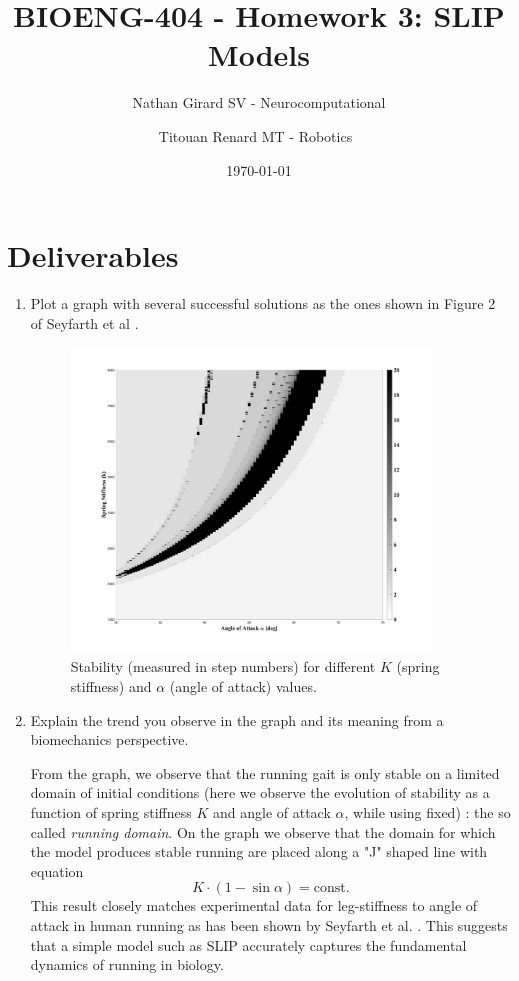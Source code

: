 \documentclass[11pt]{article}
\title{BIOENG-404 - Homework 3: SLIP Models}
\author{
    Nathan Girard
        SV - Neurocomputational
        \and
    Titouan Renard
            MT - Robotics 
}
\date{\today}
\begin{document}
\maketitle

\section{Deliverables}

\begin{enumerate}
    \item Plot a graph with several successful solutions as the ones shown in Figure 2 of Seyfarth et al \cite{1}.
    \begin{adjustwidth}{0.5cm}{}
        \begin{figure}[h!]
            \centering
            \includegraphics[width=0.9\textwidth]{screens/fig_4.jpg}
            \caption{Stability (measured in step numbers) for different $K$ (spring stiffness) and $\alpha$ (angle of attack) values.}
            \label{stability_domain}
        \end{figure}
    \end{adjustwidth}

    \item Explain the trend you observe in the graph and its meaning from a biomechanics perspective.
    \begin{adjustwidth}{0.5cm}{}
        From the graph, we observe that the running gait is only stable on a limited domain of initial conditions (here we observe the evolution of stability as a function of spring stiffness $K$ and angle of attack $\alpha$, while using fixed) : the so called \textit{running domain}. On the graph we observe that the domain for which the model produces stable running are placed along a "J" shaped line with equation 
        \[ K \cdot (1 - \sin \alpha) = \text{const}. \]
        This result closely matches experimental data for leg-stiffness to angle of attack in human running as has been shown by Seyfarth et al. \cite{1}. This suggests that a simple model such as SLIP accurately captures the fundamental dynamics of running in biology.
    \end{adjustwidth}


\end{enumerate}
\end{document}
